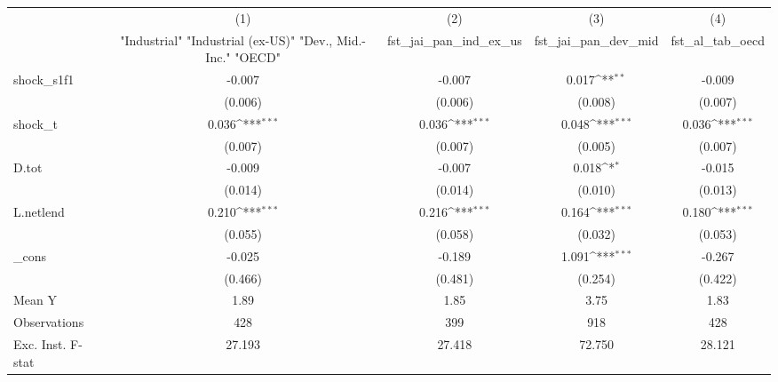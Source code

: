 {
\def\sym#1{\ifmmode^{#1}\else\(^{#1}\)\fi}
\begin{tabular}{l*{4}{c}}
\toprule
            &\multicolumn{1}{c}{(1)}&\multicolumn{1}{c}{(2)}&\multicolumn{1}{c}{(3)}&\multicolumn{1}{c}{(4)}\\
            &\multicolumn{1}{c}{ "Industrial" "Industrial (ex-US)" "Dev., Mid.-Inc." "OECD" }&\multicolumn{1}{c}{fst\_jai\_pan\_ind\_ex\_us}&\multicolumn{1}{c}{fst\_jai\_pan\_dev\_mid}&\multicolumn{1}{c}{fst\_al\_tab\_oecd}\\
\midrule
shock\_s1f1  &      -0.007         &      -0.007         &       0.017\sym{**} &      -0.009         \\
            &     (0.006)         &     (0.006)         &     (0.008)         &     (0.007)         \\
\addlinespace
shock\_t     &       0.036\sym{***}&       0.036\sym{***}&       0.048\sym{***}&       0.036\sym{***}\\
            &     (0.007)         &     (0.007)         &     (0.005)         &     (0.007)         \\
\addlinespace
D.tot       &      -0.009         &      -0.007         &       0.018\sym{*}  &      -0.015         \\
            &     (0.014)         &     (0.014)         &     (0.010)         &     (0.013)         \\
\addlinespace
L.netlend   &       0.210\sym{***}&       0.216\sym{***}&       0.164\sym{***}&       0.180\sym{***}\\
            &     (0.055)         &     (0.058)         &     (0.032)         &     (0.053)         \\
\addlinespace
\_cons      &      -0.025         &      -0.189         &       1.091\sym{***}&      -0.267         \\
            &     (0.466)         &     (0.481)         &     (0.254)         &     (0.422)         \\
\midrule
Mean Y      &        1.89         &        1.85         &        3.75         &        1.83         \\
Observations&         428         &         399         &         918         &         428         \\
Exc. Inst. F-stat&      27.193         &      27.418         &      72.750         &      28.121         \\
\bottomrule
\end{tabular}
}
